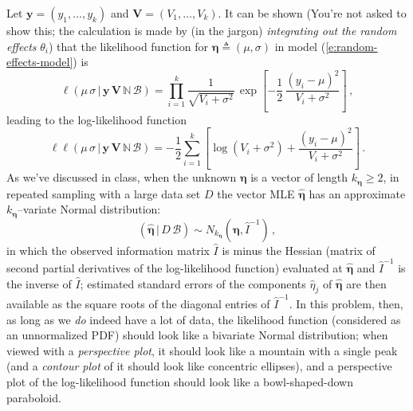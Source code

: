\documentclass[12pt]{article}
\newcommand{\given}{\, | \,}
\begin{document}
Let $\bm{ y } = ( y_1, \dots, y_k )$ and $\bm{ V } = ( V_1, \dots, V_k )$. It can be shown (You're not asked to show this; the calculation is made by (in the jargon) \textit{integrating out the random effects} $\theta_i$) that the likelihood function for $\bm{ \eta } \triangleq ( \mu, \sigma )$ in model (\ref{e:random-effects-model}) is
\begin{equation} \label{e:aspirin-likelihood}
\ell ( \mu \, \sigma \given \bm{ y } \, \bm{ V } \, \mathbb{ N } \, \mathcal{ B } ) = \prod_{ i = 1 }^k \frac{ 1 }{ \sqrt{ V_i + \sigma^2 } } \, \exp \left[ - \frac{ 1 }{ 2 } \, \frac{ ( y_i - \mu )^2 }{ V_i + \sigma^2 } \right] \, ,
\end{equation}
leading to the log-likelihood function
\begin{equation} \label{e:aspirin-log-likelihood}
\ell \ell ( \mu \, \sigma \given \bm{ y } \, \bm{ V } \, \mathbb{ N } \, \mathcal{ B } ) = - \frac{ 1 }{ 2 } \sum_{ i = 1 }^k \left[ \log ( V_i + \sigma^2 ) + \frac{ ( y_i - \mu )^2 }{ V_i + \sigma^2 } \right] \, .
\end{equation}
As we've discussed in class, when the unknown $\bm{ \eta }$ is a vector of length $k_{ \bm{ \eta } } \ge 2$, in repeated sampling with a large data set $D$ the vector MLE $\hat{ \bm{ \eta } }$ has an approximate $k_{ \bm{ \eta } }$--variate Normal distribution:
\begin{equation} \label{e:mle-big-k}
\left( \hat{ \bm{ \eta } } \given D \, \mathcal{ B } \right) \sim N_{ k_{ \bm{ \eta } } } \left( \bm{ \eta }, \hat{ I }^{ -1 } \right) \, ,
\end{equation}
in which the observed information matrix $\hat{ I }$ is minus the Hessian (matrix of second partial derivatives of the log-likelihood function) evaluated at $\hat{ \bm{ \eta } }$ and $\hat{ I }^{ -1 }$ is the inverse of $\hat{ I }$; estimated standard errors of the components $\hat{ \eta }_j$ of $\hat{ \bm{ \eta } }$ are then available as the square roots of the diagonal entries of $\hat{ I }^{ -1 }$. In this problem, then, as long as we \textit{do} indeed have a lot of data, the likelihood function (considered as an unnormalized PDF) should look like a bivariate Normal distribution; when viewed with a \textit{perspective plot}, it should look like a mountain with a single peak (and a \textit{contour plot} of it should look like concentric ellipses), and a perspective plot of the log-likelihood function should look like a bowl-shaped-down paraboloid.
\end{document}
